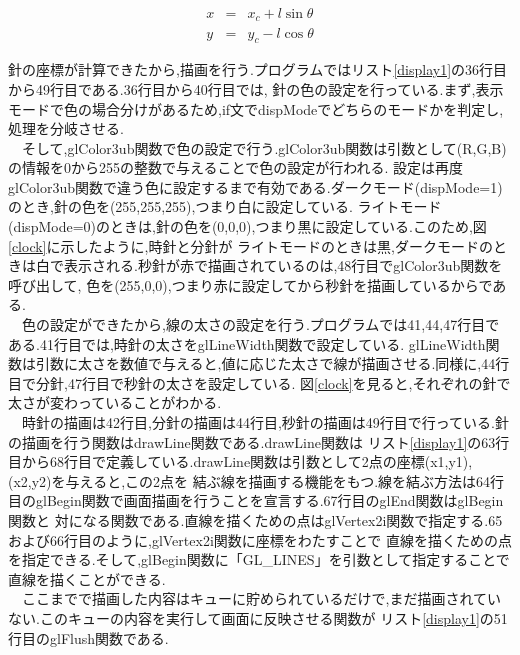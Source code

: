\documentclass[a4j]{jarticle}
\begin{document}
        \begin{eqnarray}
          \label{posix}
    x &=& x_c + l \sin \theta  \\
          \label{posiy}
    y &=& y_c - l \cos \theta
      \end{eqnarray}
        
      針の座標が計算できたから,描画を行う.プログラムではリスト\ref{display1}の36行目から49行目である.36行目から40行目では,
      針の色の設定を行っている.まず,表示モードで色の場合分けがあるため,if文でdispModeでどちらのモードかを判定し,処理を分岐させる.\\
      　そして,glColor3ub関数で色の設定で行う.glColor3ub関数は引数として(R,G,B)の情報を0から255の整数で与えることで色の設定が行われる.
      設定は再度glColor3ub関数で違う色に設定するまで有効である.ダークモード(dispMode=1)のとき,針の色を(255,255,255),つまり白に設定している.
      ライトモード(dispMode=0)のときは,針の色を(0,0,0),つまり黒に設定している.このため,図\ref{clock}に示したように,時針と分針が
      ライトモードのときは黒,ダークモードのときは白で表示される.秒針が赤で描画されているのは,48行目でglColor3ub関数を呼び出して,
      色を(255,0,0),つまり赤に設定してから秒針を描画しているからである.\\
      　色の設定ができたから,線の太さの設定を行う.プログラムでは41,44,47行目である.41行目では,時針の太さをglLineWidth関数で設定している.
      glLineWidth関数は引数に太さを数値で与えると,値に応じた太さで線が描画させる.同様に,44行目で分針,47行目で秒針の太さを設定している.
      図\ref{clock}を見ると,それぞれの針で太さが変わっていることがわかる.\\
      　時針の描画は42行目,分針の描画は44行目,秒針の描画は49行目で行っている.針の描画を行う関数はdrawLine関数である.drawLine関数は
      リスト\ref{display1}の63行目から68行目で定義している.drawLine関数は引数として2点の座標(x1,y1),(x2,y2)を与えると,この2点を
      結ぶ線を描画する機能をもつ.線を結ぶ方法は64行目のglBegin関数で画面描画を行うことを宣言する.67行目のglEnd関数はglBegin関数と
      対になる関数である.直線を描くための点はglVertex2i関数で指定する.65および66行目のように,glVertex2i関数に座標をわたすことで
      直線を描くための点を指定できる.そして,glBegin関数に「GL\_LINES」を引数として指定することで直線を描くことができる.\\
      　ここまでで描画した内容はキューに貯められているだけで,まだ描画されていない.このキューの内容を実行して画面に反映させる関数が
      リスト\ref{display1}の51行目のglFlush関数である.
\end{document}
